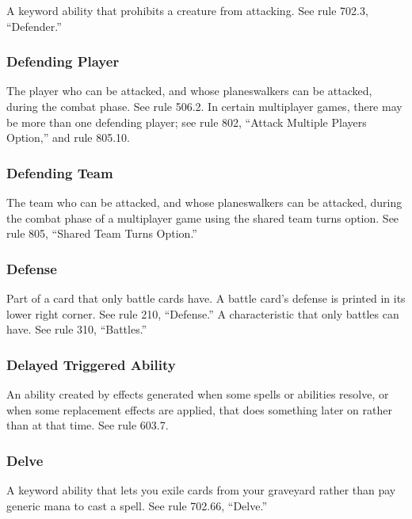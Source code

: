 {{{{{{A keyword ability that prohibits a creature from attacking. See rule 702.3, “Defender.”

\subsubsection*{Defending Player}

The player who can be attacked, and whose planeswalkers can be attacked, during the combat phase. See rule 506.2. In certain multiplayer games, there may be more than one defending player; see rule 802, “Attack Multiple Players Option,” and rule 805.10.

\subsubsection*{Defending Team}

The team who can be attacked, and whose planeswalkers can be attacked, during the combat phase of a multiplayer game using the shared team turns option. See rule 805, “Shared Team Turns Option.”

\subsubsection*{Defense}

Part of a card that only battle cards have. A battle card’s defense is printed in its lower right corner. See rule 210, “Defense.”
A characteristic that only battles can have. See rule 310, “Battles.”

\subsubsection*{Delayed Triggered Ability}


An ability created by effects generated when some spells or abilities resolve, or when some replacement effects are applied, that does something later on rather than at that time. See rule 603.7.

\subsubsection*{Delve}

A keyword ability that lets you exile cards from your graveyard rather than pay generic mana to cast a spell. See rule 702.66, “Delve.”

}}}}}}
